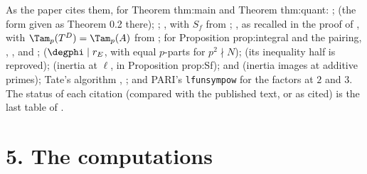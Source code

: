 As the paper cites them, for Theorem thm:main and Theorem thm:quant:
\cite[Proposition 1.4(c)]{DFG04};
\cite[Theorem 3.7]{DFG04} (the form given as Theorem 0.2 there);
\cite[Theorem 2.7]{DFG04};
\cite[Lemma 2.1]{DFG04}, with $S_f$ from \cite[(31)]{DFG04};
\cite[I.4.2.2]{FPR94}, as recalled in the proof of \cite[Theorem 2.15]{DFG04}, with $\Tam_p(T^D)=\Tam_p(A)$ from \cite[(57)]{DFG04};
for Proposition prop:integral and the pairing, \cite[\S\S1.2, 1.4]{DFG04}, \cite[Lemma 1.1]{DFG04}, \cite[\S\S1.2.1, 1.3.2]{DFG04} and
\cite[\S1.5.2, before Lemma 1.2]{DFG04};
\cite[Theorem 2.2]{ARS12} ($\degphi\mid r_E$, with equal $p$-parts for $p^2\nmid N$);
\cite[Lemma 4.17]{DDT} (its inequality half is reproved);
\cite[\S1.11, Propositions 11 and 12]{Serre72} (inertia at $\ell$, in Proposition prop:Sf);
\cite[\S2, Theorem 2]{SerreTate68} and \cite{Kraus90} (inertia images at additive primes);
Tate's algorithm \cite{Tate75}, \cite[IV.9]{SilvermanATAEC};
and PARI's \texttt{lfunsympow} \cite{PARI} for the factors at $2$ and $3$. The status of each citation (compared with the
published text, or as cited) is the last table of .

\section*{5. The computations}

